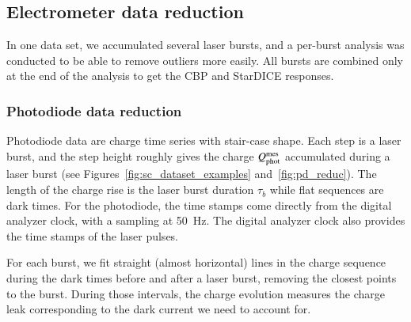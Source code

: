 \subsection{Electrometer data reduction}

In one data set, we accumulated several laser bursts, and a per-burst analysis was conducted to be able to remove outliers more easily. All bursts are combined only at the end of the analysis to get the CBP and StarDICE responses.


\subsubsection{Photodiode data reduction}
\label{sec:pd_reduction}

Photodiode data are charge time series with stair-case shape. Each step is a laser burst, and the step height roughly gives the charge $Q_{\mathrm{phot}}^{\mathrm{mes}}$ accumulated during a laser burst (see Figures~\ref{fig:sc_dataset_examples} and~\ref{fig:pd_reduc}). The length of the charge rise is the laser burst duration $\tau_b$ while flat sequences are dark times. For the photodiode, the time stamps come directly from the digital analyzer clock, with a sampling at \SI{50}{\hertz}. The digital analyzer clock also provides the time stamps of the laser pulses. 

For each burst, we fit straight (almost horizontal) lines in the charge sequence during the dark times before and after a laser burst, removing the closest points to the burst. During those intervals, the charge evolution measures the charge leak corresponding to the dark current we need to account for.


